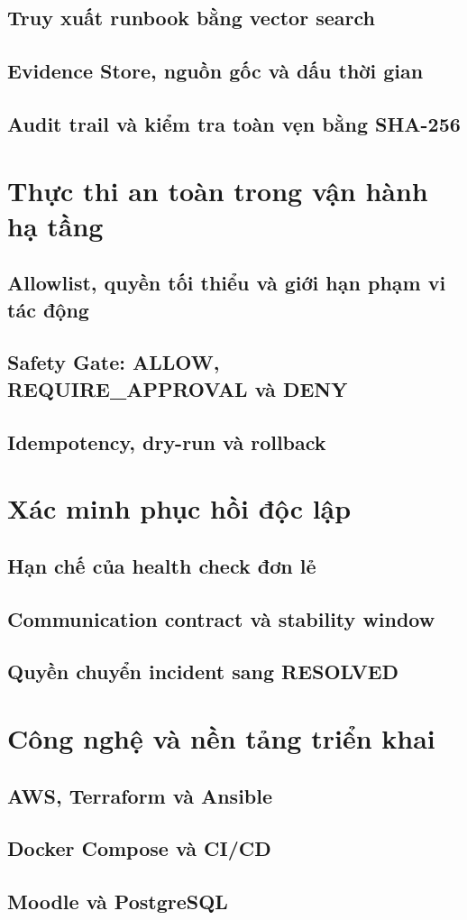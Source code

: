 \subsection{Truy xuất runbook bằng vector search}
\subsection{Evidence Store, nguồn gốc và dấu thời gian}
\subsection{Audit trail và kiểm tra toàn vẹn bằng SHA-256}


\section{Thực thi an toàn trong vận hành hạ tầng}
\subsection{Allowlist, quyền tối thiểu và giới hạn phạm vi tác động}
\subsection{Safety Gate: ALLOW, REQUIRE\_APPROVAL và DENY}
\subsection{Idempotency, dry-run và rollback}


\section{Xác minh phục hồi độc lập}
\subsection{Hạn chế của health check đơn lẻ}
\subsection{Communication contract và stability window}
\subsection{Quyền chuyển incident sang RESOLVED}


\section{Công nghệ và nền tảng triển khai}
\subsection{AWS, Terraform và Ansible}
\subsection{Docker Compose và CI/CD}
\subsection{Moodle và PostgreSQL}
